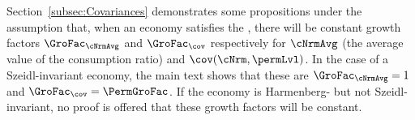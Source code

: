 \documentclass[\econtexRoot/BufferStockTheory]{subfiles}
\begin{document}

\label{sec:ApndxBalancedGrowthcNrmAndCov}

Section~\ref{subsec:Covariances} demonstrates some propositions under the assumption that, when an economy satisfies the {\GICRaw}, there will be constant growth factors $\GroFac_{\cNrmAvg}$ and $\GroFac_{\cov}$ respectively for $\cNrmAvg$ (the average value of the consumption ratio) and $\cov(\cNrm,\permLvl)$.  In the case of a Szeidl-invariant economy, the main text shows that these are $\GroFac_{\cNrmAvg}=1$ and $\GroFac_{\cov}=\PermGroFac$.  If the economy is Harmenberg- but not Szeidl-invariant, no proof is offered that these growth factors will be constant.

\end{document}
